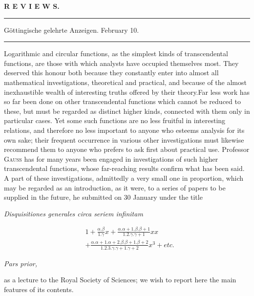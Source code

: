 \clearpage{}
\begin{center}\textbf{R E V I E W S.}\end{center}
\par{}\begin{center}
\rule{0.52\linewidth}{0.3pt}\par\medskip
Göttingische gelehrte Anzeigen. February 10.\par\medskip
\rule{0.52\linewidth}{0.3pt}
\end{center}

Logarithmic and circular functions, as the simplest kinds of transcendental functions, are those with which analysts have occupied themselves most. They deserved this honour both because they constantly enter into almost all mathematical investigations, theoretical and practical, and because of the almost inexhaustible wealth of interesting truths offered by their theory.\quad Far less work has so far been done on other transcendental functions which cannot be reduced to these, but must be regarded as distinct higher kinds, connected with them only in particular cases. Yet some such functions are no less fruitful in interesting relations, and therefore no less important to anyone who esteems analysis for its own sake; their frequent occurrence in various other investigations must likewise recommend them to anyone who prefers to ask first about practical use. Professor \textsc{Gauss} has for many years been engaged in investigations of such higher transcendental functions, whose far-reaching results confirm what has been said. A part of these investigations, admittedly a very small one in proportion, which may be regarded as an introduction, as it were, to a series of papers to be supplied in the future, he submitted on 30 January under the title

\begin{center}\emph{Disquisitiones generales circa seriem infinitam}\end{center}
\[
\begin{aligned}&1+\frac{\alpha.\beta}{1.\gamma}x
+\frac{\alpha.\alpha+1.\beta.\beta+1}{1.2.\gamma.\gamma+1}xx
\\[5pt]&+\frac{\alpha.\alpha+1.\alpha+2.\beta.\beta+1.\beta+2}{1.2.3.\gamma.\gamma+1.\gamma+2}x^3+\mathit{etc.}\end{aligned}
\]
\begin{center}\emph{Pars prior,}\end{center}
as a lecture to the Royal Society of Sciences; we wish to report here the main features of its contents.

